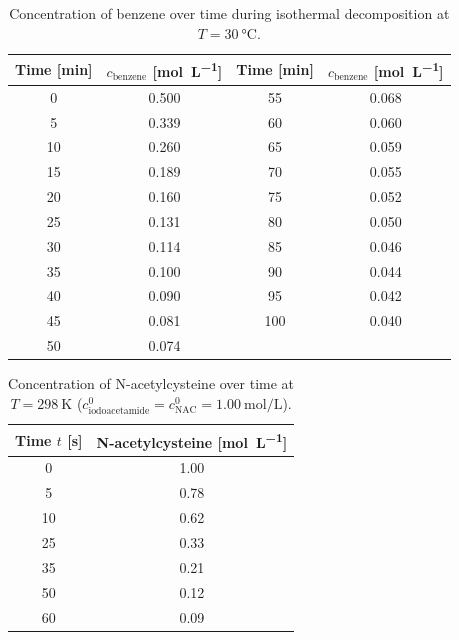 \begin{table}[htbp]
    \centering
    \caption{Concentration of benzene over time during isothermal decomposition at $T = \SI{30}{\degreeCelsius}$.}
    \label{tab:task2_benzene}
    \begin{tabular}{cc@{\hspace{1.5cm}}cc}
        \toprule
        \textbf{Time} [\si{\minute}] & $c_{\text{benzene}}$ [\si{\mole\per\liter}] & \textbf{Time} [\si{\minute}] & $c_{\text{benzene}}$ [\si{\mole\per\liter}] \\
        \midrule
        0  & 0.500 & 55  & 0.068 \\
        5  & 0.339 & 60  & 0.060 \\
        10 & 0.260 & 65  & 0.059 \\
        15 & 0.189 & 70  & 0.055 \\
        20 & 0.160 & 75  & 0.052 \\
        25 & 0.131 & 80  & 0.050 \\
        30 & 0.114 & 85  & 0.046 \\
        35 & 0.100 & 90  & 0.044 \\
        40 & 0.090 & 95  & 0.042 \\
        45 & 0.081 & 100 & 0.040 \\
        50 & 0.074 &     &       \\
        \bottomrule
    \end{tabular}
\end{table}

\begin{table}[htbp]
    \centering
    \caption{Concentration of N-acetylcysteine over time at $T = \SI{298}{\kelvin}$ ($c^0_{\text{iodoacetamide}} = c^0_{\text{NAC}} = \SI{1.00}{\mole\per\liter}$).}
    \label{tab:task3_nac}
    \begin{tabular}{cc}
        \toprule
        \textbf{Time} $t$ [\si{\second}] & \textbf{N-acetylcysteine} [\si{\mole\per\liter}] \\
        \midrule
        0  & 1.00 \\
        5  & 0.78 \\
        10 & 0.62 \\
        25 & 0.33 \\
        35 & 0.21 \\
        50 & 0.12 \\
        60 & 0.09 \\
        \bottomrule
    \end{tabular}
\end{table}


